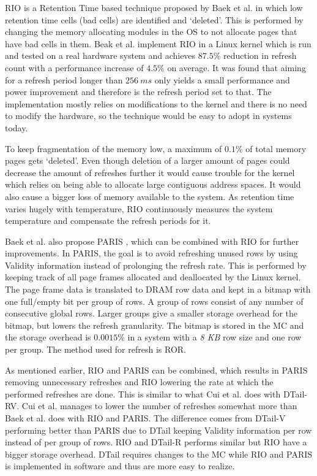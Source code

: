 RIO is a Retention Time based technique proposed by Baek et al. \cite{rioparis} in which low retention time cells (bad cells) are identified and `deleted'. This is performed by changing the memory allocating modules in the OS to not allocate pages that have bad cells in them. Beak et al. implement RIO in a Linux kernel which is run and tested on a real hardware system and achieves $87.5\%$ reduction in refresh count with a performance increase of $4.5\%$ on average. It was found that aiming for a refresh period longer than $256~ms$ only yields a small performance and power improvement and therefore is the refresh period set to that. The implementation mostly relies on modifications to the kernel and there is no need to modify the hardware, so the technique would be easy to adopt in systems today. 

To keep fragmentation of the memory low, a maximum of $0.1\%$ of total memory pages gets `deleted'. Even though deletion of a larger amount of pages could decrease the amount of refreshes further it would cause trouble for the kernel which relies on being able to allocate large contiguous address spaces. It would also cause a bigger loss of memory available to the system. As retention time varies hugely with temperature, RIO continuously measures the system temperature and compensate the refresh periods for it. 

Baek et al. also propose PARIS \cite{rioparis}, which can be combined with RIO for further improvements. In PARIS, the goal is to avoid refreshing unused rows by using Validity information instead of prolonging the refresh rate. This is performed by keeping track of all page frames allocated and deallocated by the Linux kernel. The page frame data is translated to DRAM row data and kept in a bitmap with one full/empty bit per group of rows. A group of rows consist of any number of consecutive global rows. Larger groups give a smaller storage overhead for the bitmap, but lowers the refresh granularity. The bitmap is stored in the MC and the storage overhead is $0.0015\%$ in a system with a \textit{8 KB} row size and one row per group. The method used for refresh is ROR. 

As mentioned earlier, RIO and PARIS can be combined, which results in PARIS removing unnecessary refreshes and RIO lowering the rate at which the performed refreshes are done. This is similar to what Cui et al. does with DTail-RV. Cui et al. manages to lower the number of refreshes somewhat more than Baek et al. does with RIO and PARIS. The difference comes from DTail-V performing better than PARIS due to DTail keeping Validity information per row instead of per group of rows. RIO and DTail-R performs similar but RIO have a bigger storage overhead. DTail requires changes to the MC while RIO and PARIS is implemented in software and thus are more easy to realize. 